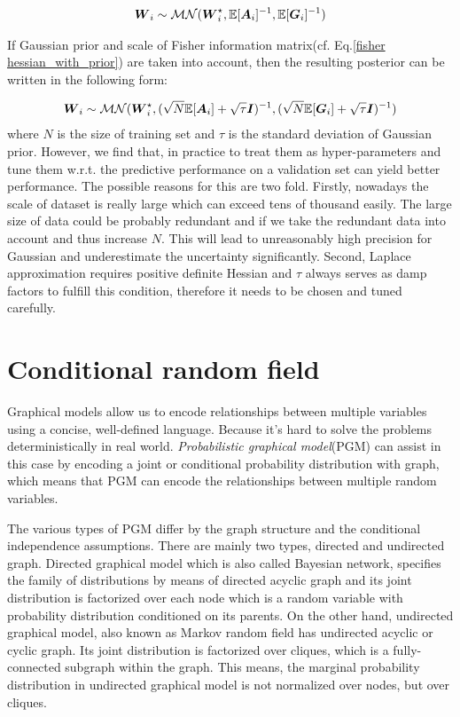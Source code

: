 \begin{equation}
\begin{aligned} \label{mvg}
\boldsymbol W_{i} \sim \mathcal{MN}(\boldsymbol W_i^\star, \mathbb E[\boldsymbol A_i]^{-1}, \mathbb E[\boldsymbol G_i]^{-1})
\end{aligned}
\end{equation}

If Gaussian prior and scale of Fisher information matrix(cf. Eq.\ref{fisher hessian_with_prior}) are taken into account, then the resulting posterior can be written in the following form:

\begin{equation}
\begin{aligned} \label{mvg_prior}
\boldsymbol W_{i} \sim \mathcal{MN}(\boldsymbol W_i^\star, (\sqrt{N} \mathbb E[\boldsymbol A_i]+\sqrt{\tau}\boldsymbol I)^{-1}, (\sqrt{N}\mathbb E[\boldsymbol G_i]+\sqrt{\tau}\boldsymbol I)^{-1})
\end{aligned}
\end{equation} 
where $N$ is the size of training set and $\tau$ is the standard deviation of Gaussian prior.
However, we find that, in practice to treat them as hyper-parameters and tune them w.r.t. the predictive performance on a validation set can yield better performance. The possible reasons for this are two fold. Firstly, nowadays the scale of dataset is really large which can exceed tens of thousand easily. The large size of data could be probably redundant and if we take the redundant data into account and thus increase $N$. This will lead to unreasonably high precision for Gaussian and underestimate the uncertainty significantly. Second, Laplace approximation requires positive definite Hessian and $\tau$ always serves as damp factors to fulfill this condition, therefore it needs to be chosen and tuned carefully.    


\section{Conditional random field}
Graphical models allow us to encode relationships between multiple variables using a concise, well-defined language. Because it's hard to solve the problems deterministically in real world. \textit{Probabilistic graphical model}(PGM)\cite{koller2009probabilistic} can assist in this case by encoding a joint or conditional probability distribution with graph, which means that PGM can encode the relationships between multiple random variables. 

The various types of PGM differ by the graph structure and the conditional independence assumptions. There are mainly two types, directed and undirected graph. Directed graphical model which is also called Bayesian network, specifies the family of distributions by means of directed acyclic graph and its joint distribution is factorized over each node which is a random variable with probability distribution conditioned on its parents. On the other hand, undirected graphical model, also known as Markov random field has undirected acyclic or cyclic graph. Its joint distribution is factorized over cliques, which is a fully-connected subgraph within the graph. This means, the marginal probability distribution in undirected graphical model is not normalized over nodes, but over cliques. 

